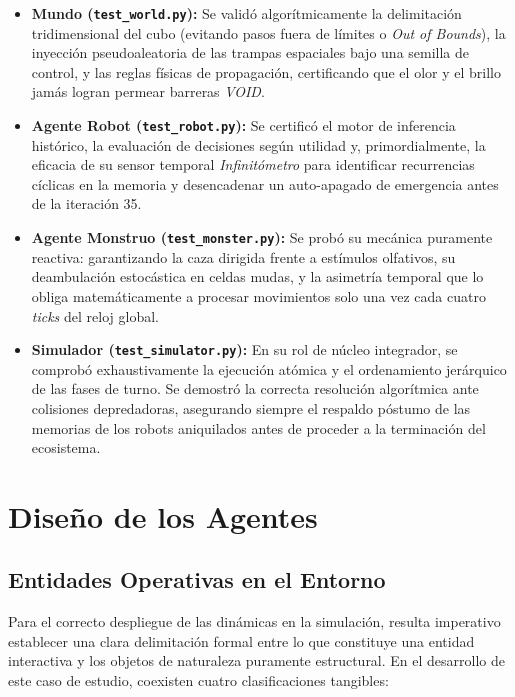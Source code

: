 \documentclass[conference]{IEEEtran}
\begin{document}
\begin{itemize}
    \item \textbf{Mundo (\texttt{test\_world.py}):} Se validó algorítmicamente la delimitación tridimensional del cubo (evitando pasos fuera de límites o \textit{Out of Bounds}), la inyección pseudoaleatoria de las trampas espaciales bajo una semilla de control, y las reglas físicas de propagación, certificando que el olor y el brillo jamás logran permear barreras \textit{VOID}.
    \item \textbf{Agente Robot (\texttt{test\_robot.py}):} Se certificó el motor de inferencia histórico, la evaluación de decisiones según utilidad y, primordialmente, la eficacia de su sensor temporal \textit{Infinitómetro} para identificar recurrencias cíclicas en la memoria y desencadenar un auto-apagado de emergencia antes de la iteración 35.
    \item \textbf{Agente Monstruo (\texttt{test\_monster.py}):} Se probó su mecánica puramente reactiva: garantizando la caza dirigida frente a estímulos olfativos, su deambulación estocástica en celdas mudas, y la asimetría temporal que lo obliga matemáticamente a procesar movimientos solo una vez cada cuatro \textit{ticks} del reloj global.
    \item \textbf{Simulador (\texttt{test\_simulator.py}):} En su rol de núcleo integrador, se comprobó exhaustivamente la ejecución atómica y el ordenamiento jerárquico de las fases de turno. Se demostró la correcta resolución algorítmica ante colisiones depredadoras, asegurando siempre el respaldo póstumo de las memorias de los robots aniquilados antes de proceder a la terminación del ecosistema.
\end{itemize}

\section{Diseño de los Agentes}

\subsection{Entidades Operativas en el Entorno}
Para el correcto despliegue de las dinámicas en la simulación, resulta imperativo establecer una clara delimitación formal entre lo que constituye una entidad interactiva y los objetos de naturaleza puramente estructural. En el desarrollo de este caso de estudio, coexisten cuatro clasificaciones tangibles:
\end{document}
